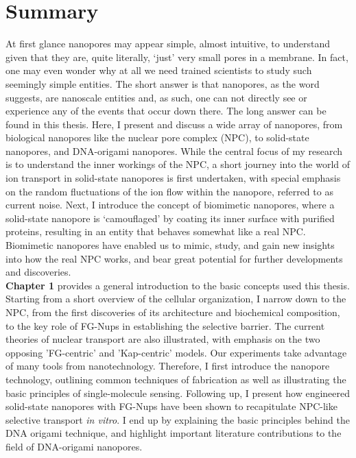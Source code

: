 \chapter*{Summary}

At first glance nanopores may appear simple, almost intuitive, to understand given that they are, quite literally, `just' very small pores in a membrane. In fact, one may even wonder why at all we need trained scientists to study such seemingly simple entities. The short answer is that nanopores, as the word suggests, are nanoscale entities and, as such, one can not directly see or experience any of the events that occur down there. The long answer can be found in this thesis. Here, I present and discuss a wide array of nanopores, from biological nanopores like the nuclear pore complex (NPC), to solid-state nanopores, and DNA-origami nanopores. While the central focus of my research is to understand the inner workings of the NPC, a short journey into the world of ion transport in solid-state nanopores is first undertaken, with special emphasis on the random fluctuations of the ion flow within the nanopore, referred to as current noise. Next, I introduce the concept of biomimetic nanopores, where a solid-state nanopore is `camouflaged' by coating its inner surface with purified proteins, resulting in an entity that behaves somewhat like a real NPC. Biomimetic nanopores have enabled us to mimic, study, and gain new insights into how the real NPC works, and bear great potential for further developments and discoveries.\\[0.5pt]

\noindent \textbf{Chapter 1} provides a general introduction to the basic concepts used this thesis. Starting from a short overview of the cellular organization, I narrow down to the NPC, from the first discoveries of its architecture and biochemical composition, to the key role of FG-Nups in establishing the selective barrier. The current theories of nuclear transport are also illustrated, with emphasis on the two opposing 'FG-centric' and 'Kap-centric' models. Our experiments take advantage of many tools from nanotechnology. Therefore, I first introduce the nanopore technology, outlining common techniques of fabrication as well as illustrating the basic principles of single-molecule sensing. Following up, I present how engineered solid-state nanopores with FG-Nups have been shown to recapitulate NPC-like selective transport \emph{in vitro}. I end up by explaining the basic principles behind the DNA origami technique, and highlight important literature contributions to the field of DNA-origami nanopores.\\[0.5pt]

